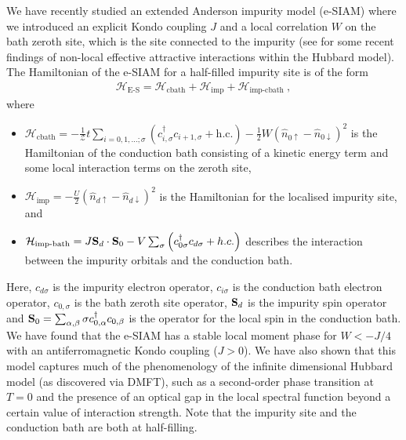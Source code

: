 \documentclass[reprint,hidelinks,onecolumn]{revtex4-2}
\begin{document}
We have recently studied an extended Anderson impurity model (e-SIAM) where we introduced an explicit Kondo coupling \(J\) and a local correlation \(W\) on the bath zeroth site, which is the site connected to the impurity (see \cite{gazizovaleblanc2023} for some recent findings of non-local effective attractive interactions within the Hubbard model). The Hamiltonian of the e-SIAM for a half-filled impurity site is of the form
\begin{equation}\begin{aligned}
	\label{siam_attr}
	\mathcal{H}_\text{E-S} = \mathcal{H}_\text{cbath} + \mathcal{H}_\text{imp} + \mathcal{H}_\text{imp-cbath}~,
\end{aligned}\end{equation}
where 
\begin{itemize}
	\item \(\mathcal{H}_\text{cbath} = -\frac{1}{\mathcal{Z}}t\sum_{i=0,1,\ldots;\sigma}\left(c^\dagger_{i,\sigma}c_{i+1,\sigma} + \text{h.c.}\right) - \frac{1}{2}W\left(\hat n_{0 \uparrow} - \hat n_{0 \downarrow}\right)^2\) is the Hamiltonian of the conduction bath consisting of a kinetic energy term and some local interaction terms on the zeroth site,
	\item \(\mathcal{H}_\text{imp} = - \frac{U}{2}\left(\hat n_{d \uparrow} - \hat n_{d \downarrow} \right) ^2\) is the Hamiltonian for the localised impurity site, and
	\item \(\mathcal{H}_\text{imp-bath} = J {\bf S}_d\cdot{\bf S}_0 - V \sum_{\sigma} \left(c^\dagger_{0\sigma} c_{d\sigma} + h.c.\right)\) describes the interaction between the impurity orbitals and the conduction bath.
\end{itemize}
Here, \(c_{d\sigma}\) is the impurity electron operator, \(c_{i\sigma}\) is the conduction bath electron operator, \(c_{0,\sigma}\) is the bath zeroth site operator, \({\bf S}_d\) is the impurity spin operator and \({\bf S}_0 = \sum_{\alpha,\beta}{\bf \sigma}c^\dagger_{0,\alpha}c_{0,\beta}\) is the operator for the local spin in the conduction bath. We have found that the e-SIAM has a stable local moment phase for \(W < -J/4\) with an antiferromagnetic Kondo coupling (\(J > 0\)). We have also shown that this model captures much of the phenomenology of the infinite dimensional Hubbard model (as discovered via DMFT), such as a second-order phase transition at \(T=0\) and the presence of an optical gap in the local spectral function beyond a certain value of interaction strength. Note that the impurity site and the conduction bath are both at half-filling.
\end{document}
